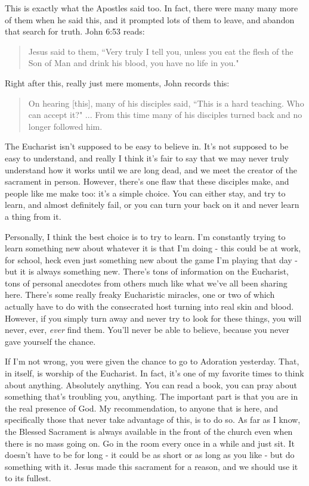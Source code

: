 \documentclass[12pt]{article}
\begin{document}
    This is exactly what the Apostles said too. In fact, there were many many more of them when he said this, and it
    prompted lots of them to leave, and abandon that search for truth. John 6:53 reads: 
    \begin{quote}
      Jesus said to them, ``Very truly I tell you, unless you eat the flesh of the Son of Man and drink his blood, you
      have no life in you."
    \end{quote}
    Right after this, really just mere moments, John records this:
    \begin{quote}
      On hearing [this], many of his disciples said, ``This is a hard teaching. Who can accept it?" ... From this time 
      many of his disciples turned back and no longer followed him.
    \end{quote}
    The Eucharist isn't supposed to be easy to believe in. It's not supposed to be easy to understand, and really I think
    it's fair to say that we may never truly understand how it works until we are long dead, and we meet the creator of
    the sacrament in person. However, there's one flaw that these disciples make, and people like me make too: it's a 
    simple choice. You can either stay, and try to learn, and almost definitely fail, or you can turn your back on it
    and never learn a thing from it.

    Personally, I think the best choice is to try to learn. I'm constantly trying to learn something new about whatever it
    is that I'm doing - this could be at work, for school, heck even just something new about the game I'm playing that day -
    but it is always something new. There's tons of information on the Eucharist, tons of personal anecdotes from others
    much like what we've all been sharing here. There's some really freaky Eucharistic miracles, one or two of which actually
    have to do with the consecrated host turning into real skin and blood. However, if you simply turn away and never try
    to look for these things, you will never, ever, \textit{ever} find them. You'll never be able to believe, because you
    never gave yourself the chance.

    If I'm not wrong, you were given the chance to go to Adoration yesterday. That, in itself, is worship of the Eucharist.
    In fact, it's one of my favorite times to think about anything. Absolutely anything. You can read a book, you can pray
    about something that's troubling you, anything. The important part is that you are in the real presence of God. My
    recommendation, to anyone that is here, and specifically those that never take advantage of this, is to do so. As far
    as I know, the Blessed Sacrament is always available in the front of the church even when there is no mass going on.
    Go in the room every once in a while and just sit. It doesn't have to be for long - it could be as short or as long as
    you like - but do something with it. Jesus made this sacrament for a reason, and we should use it to its fullest.
\end{document}
